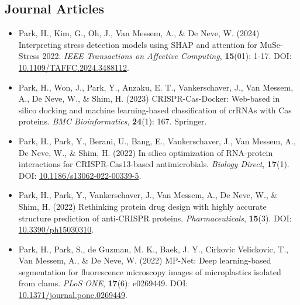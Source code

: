 \documentclass[11pt]{article}
\begin{document}
\subsection{Journal Articles}
\begin{itemize}
    \item[\checkmark] Park, H., Kim, G., Oh, J., Van Messem, A., \& De Neve, W. (2024) Interpreting stress detection models using SHAP and attention for MuSe-Stress 2022. \textit{IEEE Transactions on Affective Computing}, \textbf{15}(01): 1-17. DOI: \href{https://doi.org/10.1109/TAFFC.2024.3488112}{10.1109/TAFFC.2024.3488112}.
    \item[\checkmark] Park, H., Won, J., Park, Y., Anzaku, E. T., Vankerschaver, J., Van Messem, A., De Neve, W., \& Shim, H. (2023) CRISPR-Cas-Docker: Web-based in silico docking and machine learning-based classification of crRNAs with Cas proteins. \textit{BMC Bioinformatics}, \textbf{24}(1): 167. Springer.
    \item[\checkmark] Park, H., Park, Y., Berani, U., Bang, E., Vankerschaver, J., Van Messem, A., De Neve, W., \& Shim, H. (2022) In silico optimization of RNA-protein interactions for CRISPR-Cas13-based antimicrobials. \textit{Biology Direct}, \textbf{17}(1). DOI: \href{https://doi.org/10.1186/s13062-022-00339-5}{10.1186/s13062-022-00339-5}.
    \item[\checkmark] Park, H., Park, Y., Vankerschaver, J., Van Messem, A., De Neve, W., \& Shim, H. (2022) Rethinking protein drug design with highly accurate structure prediction of anti-CRISPR proteins. \textit{Pharmaceuticals}, \textbf{15}(3). DOI: \href{https://doi.org/10.3390/ph15030310}{10.3390/ph15030310}.
    \item[\checkmark] Park, H., Park, S., de Guzman, M. K., Baek, J. Y., Cirkovic Velickovic, T., Van Messem, A., \& De Neve, W. (2022) MP-Net: Deep learning-based segmentation for fluorescence microscopy images of microplastics isolated from clams. \textit{PLoS ONE}, \textbf{17}(6): e0269449. DOI: \href{https://doi.org/10.1371/journal.pone.0269449}{10.1371/journal.pone.0269449}.
\end{itemize}
\end{document}
